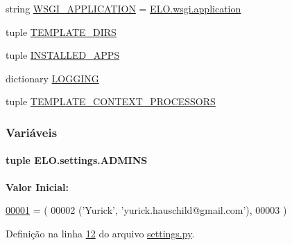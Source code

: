 \begin{DoxyCompactItemize}
string \hyperlink{namespaceELO_1_1settings_a065d3c6028b923c4918002832d2527be}{W\+S\+G\+I\+\_\+\+A\+P\+P\+L\+I\+C\+A\+T\+I\+O\+N} = \textquotesingle{}\hyperlink{namespaceELO_1_1wsgi_a8951c4ea2920440aeeb73c65ab517a5d}{E\+L\+O.\+wsgi.\+application}\textquotesingle{}
\item 
tuple \hyperlink{namespaceELO_1_1settings_a4e977a41e98923ee4c93b24d22b3d7e2}{T\+E\+M\+P\+L\+A\+T\+E\+\_\+\+D\+I\+R\+S}
\item 
tuple \hyperlink{namespaceELO_1_1settings_a1a4752075da59d93477195bcc3fc4765}{I\+N\+S\+T\+A\+L\+L\+E\+D\+\_\+\+A\+P\+P\+S}
\item 
dictionary \hyperlink{namespaceELO_1_1settings_addc421e02af1569796e2d33b2bc62ff5}{L\+O\+G\+G\+I\+N\+G}
\item 
tuple \hyperlink{namespaceELO_1_1settings_ad62b51880946e9380913c2f3811311bf}{T\+E\+M\+P\+L\+A\+T\+E\+\_\+\+C\+O\+N\+T\+E\+X\+T\+\_\+\+P\+R\+O\+C\+E\+S\+S\+O\+R\+S}
\end{DoxyCompactItemize}


\subsubsection{Variáveis}
\hypertarget{namespaceELO_1_1settings_a051220bd8105ba13b2720df11c1950ba}{}
\paragraph[{A\+D\+M\+I\+N\+S}]{\setlength{\rightskip}{0pt plus 5cm}tuple E\+L\+O.\+settings.\+A\+D\+M\+I\+N\+S}\label{namespaceELO_1_1settings_a051220bd8105ba13b2720df11c1950ba}
{\bfseries Valor Inicial\+:}
\begin{DoxyCode}
\hypertarget{namespaceELO_1_1settings_l00001}{}\hyperlink{namespaceELO_1_1settings}{00001} = (
00002     (\textcolor{stringliteral}{'Yurick'}, \textcolor{stringliteral}{'yurick.hauschild@gmail.com'}),
00003 )
\end{DoxyCode}


Definição na linha \hyperlink{settings_8py_source_l00012}{12} do arquivo \hyperlink{settings_8py_source}{settings.\+py}.

\hypertarget{namespaceELO_1_1settings_afd72644768367440ae1a89e9fe95cde5}{}

